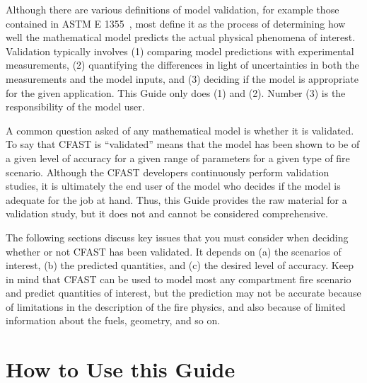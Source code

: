 Although there are various definitions of model validation, for example those contained in
ASTM E 1355~\cite{ASTM:E1355}, most define it as the process of determining how well the mathematical model
predicts the actual physical phenomena of interest.
Validation typically involves (1) comparing model predictions with experimental measurements, (2) quantifying the differences in light of uncertainties in
both the measurements and the model inputs, and (3) deciding if the model is appropriate for the given application. This Guide only does (1) and (2). Number (3) is
the responsibility of the model user.

A common question asked of any mathematical model is whether it is validated. To say that CFAST is
``validated'' means that the model has been shown to be of a given level of accuracy for a given range of parameters for a given
type of fire scenario. Although the CFAST developers continuously perform validation studies, it is ultimately the end user of the model who
decides if the model is adequate for the job at hand. Thus, this Guide provides the raw material for a validation study, but it does not
and cannot be considered comprehensive.

The following sections discuss key issues that you must consider when deciding whether or not CFAST has been validated. It depends on (a) the scenarios
of interest, (b) the predicted quantities, and (c) the desired level of accuracy. Keep in mind that CFAST can be used to model most any compartment fire scenario and predict
quantities of interest, but the prediction may not be accurate because of limitations in the description of the fire physics, and also because of limited
information about the fuels, geometry, and so on.


\section{How to Use this Guide}


